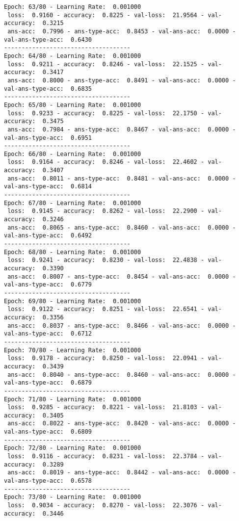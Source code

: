 \documentclass{report}
\begin{document}
\begin{verbatim}
Epoch: 63/80 - Learning Rate:  0.001000
 loss:  0.9160 - accuracy:  0.8225 - val-loss:  21.9564 - val-accuracy:  0.3215
 ans-acc:  0.7996 - ans-type-acc:  0.8453 - val-ans-acc:  0.0000 - val-ans-type-acc:  0.6430
------------------------------------
Epoch: 64/80 - Learning Rate:  0.001000
 loss:  0.9211 - accuracy:  0.8246 - val-loss:  22.1525 - val-accuracy:  0.3417
 ans-acc:  0.8000 - ans-type-acc:  0.8491 - val-ans-acc:  0.0000 - val-ans-type-acc:  0.6835
------------------------------------
Epoch: 65/80 - Learning Rate:  0.001000
 loss:  0.9233 - accuracy:  0.8225 - val-loss:  22.1750 - val-accuracy:  0.3475
 ans-acc:  0.7984 - ans-type-acc:  0.8467 - val-ans-acc:  0.0000 - val-ans-type-acc:  0.6951
------------------------------------
Epoch: 66/80 - Learning Rate:  0.001000
 loss:  0.9164 - accuracy:  0.8246 - val-loss:  22.4602 - val-accuracy:  0.3407
 ans-acc:  0.8011 - ans-type-acc:  0.8481 - val-ans-acc:  0.0000 - val-ans-type-acc:  0.6814
------------------------------------
Epoch: 67/80 - Learning Rate:  0.001000
 loss:  0.9145 - accuracy:  0.8262 - val-loss:  22.2900 - val-accuracy:  0.3246
 ans-acc:  0.8065 - ans-type-acc:  0.8460 - val-ans-acc:  0.0000 - val-ans-type-acc:  0.6492
------------------------------------
Epoch: 68/80 - Learning Rate:  0.001000
 loss:  0.9241 - accuracy:  0.8230 - val-loss:  22.4838 - val-accuracy:  0.3390
 ans-acc:  0.8007 - ans-type-acc:  0.8454 - val-ans-acc:  0.0000 - val-ans-type-acc:  0.6779
------------------------------------
Epoch: 69/80 - Learning Rate:  0.001000
 loss:  0.9122 - accuracy:  0.8251 - val-loss:  22.6541 - val-accuracy:  0.3356
 ans-acc:  0.8037 - ans-type-acc:  0.8466 - val-ans-acc:  0.0000 - val-ans-type-acc:  0.6712
------------------------------------
Epoch: 70/80 - Learning Rate:  0.001000
 loss:  0.9178 - accuracy:  0.8250 - val-loss:  22.0941 - val-accuracy:  0.3439
 ans-acc:  0.8040 - ans-type-acc:  0.8460 - val-ans-acc:  0.0000 - val-ans-type-acc:  0.6879
------------------------------------
Epoch: 71/80 - Learning Rate:  0.001000
 loss:  0.9285 - accuracy:  0.8221 - val-loss:  21.8103 - val-accuracy:  0.3405
 ans-acc:  0.8022 - ans-type-acc:  0.8420 - val-ans-acc:  0.0000 - val-ans-type-acc:  0.6809
------------------------------------
Epoch: 72/80 - Learning Rate:  0.001000
 loss:  0.9116 - accuracy:  0.8231 - val-loss:  22.3784 - val-accuracy:  0.3289
 ans-acc:  0.8019 - ans-type-acc:  0.8442 - val-ans-acc:  0.0000 - val-ans-type-acc:  0.6578
------------------------------------
Epoch: 73/80 - Learning Rate:  0.001000
 loss:  0.9034 - accuracy:  0.8270 - val-loss:  22.3076 - val-accuracy:  0.3446

\end{verbatim}
\end{document}
